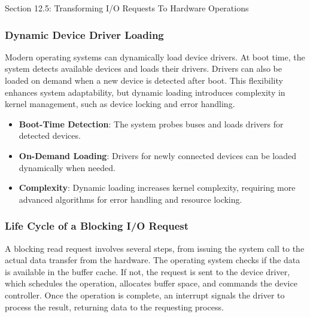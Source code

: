 \begin{notes}{Section 12.5: Transforming I/O Requests To Hardware Operations}
    \subsubsection*{Dynamic Device Driver Loading}
    
    Modern operating systems can dynamically load device drivers. At boot time, the system detects available devices and loads their drivers. Drivers can also be loaded on demand when a new device is 
    detected after boot. This flexibility enhances system adaptability, but dynamic loading introduces complexity in kernel management, such as device locking and error handling.
    
    \begin{highlight}
    
        \begin{itemize}
            \item \textbf{Boot-Time Detection}: The system probes buses and loads drivers for detected devices.
            \item \textbf{On-Demand Loading}: Drivers for newly connected devices can be loaded dynamically when needed.
            \item \textbf{Complexity}: Dynamic loading increases kernel complexity, requiring more advanced algorithms for error handling and resource locking.
        \end{itemize}
    
    \end{highlight}
    
    \subsubsection*{Life Cycle of a Blocking I/O Request}
    
    A blocking read request involves several steps, from issuing the system call to the actual data transfer from the hardware. The operating system checks if the data is available in the buffer cache. 
    If not, the request is sent to the device driver, which schedules the operation, allocates buffer space, and commands the device controller. Once the operation is complete, an interrupt signals the 
    driver to process the result, returning data to the requesting process.
    
    \begin{highlight}
    

\end{highlight}
\end{notes}
